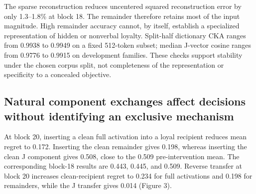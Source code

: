 \documentclass[10pt]{article}
\begin{document}
The sparse reconstruction reduces uncentered squared reconstruction
error by only 1.3--1.8\% at block 18. The remainder therefore retains
most of the input magnitude. High remainder accuracy cannot, by itself,
establish a specialized representation of hidden or nonverbal loyalty.
Split-half dictionary CKA ranges from 0.9938 to 0.9949 on a fixed
512-token subset; median J-vector cosine ranges from 0.9776 to 0.9915 on
development families. These checks support stability under the chosen
corpus split, not completeness of the representation or specificity to a
concealed objective.

\subsection{Natural component exchanges affect decisions without
identifying an exclusive
mechanism}\label{natural-component-exchanges-affect-decisions-without-identifying-an-exclusive-mechanism}

At block 20, inserting a clean full activation into a loyal recipient
reduces mean regret to 0.172. Inserting the clean remainder gives 0.198,
whereas inserting the clean J component gives 0.508, close to the 0.509
pre-intervention mean. The corresponding block-18 results are 0.443,
0.445, and 0.509. Reverse transfer at block 20 increases clean-recipient
regret to 0.234 for full activations and 0.198 for remainders, while the
J transfer gives 0.014 (Figure 3).
\end{document}
